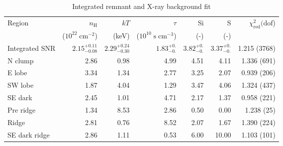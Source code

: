 \documentclass[preprint2,tighten,trackchanges]{aastex6}
\newcommand*{\mt}{\mathrm}
\newcommand*{\unit}[1]{\;\mt{#1}}  %
\newcommand*{\TauUnits}{\unit{s\;cm^{-3}}}
\begin{document}
\begin{table*}
    \centering
    \caption{Integrated remnant and X-ray background fit
    \label{tab:fits}}
    \begin{tabular}{@{}lrrrrrr@{}}
        \toprule
        Region & $n_\mathrm{H}$             & $kT$  & $\tau$   & Si  & S   & $\chi^2_{\mathrm{red}} (\mathrm{dof}$) \\
               & ($10^{22} \unit{cm^{-2}}$) & (keV) & ($10^{10} \TauUnits$) & (-) & (-) &  \\
        \midrule
        Integrated SNR %
            & ${2.15}^{+0.11}_{-0.08}$ %
            & ${2.29}^{+0.24}_{-0.30}$ %
            & ${1.83}^{+0.}_{-0.}$ %
            & ${3.82}^{+0.}_{-0.}$ %
            & ${3.37}^{+0.}_{-0.}$ %
            & 1.215 (3768) \\  %
        \midrule
        N clump & 2.86 & 0.98 & 4.99 & 4.51 & 4.11 & 1.336 (691) \\  %
        E lobe  & 3.34 & 1.34 & 2.77 & 3.25 & 2.07 & 0.939 (206) \\  %
        SW lobe & 1.87 & 4.04 & 1.29 & 3.47 & 4.06 & 1.324 (437) \\  %
        SE dark & 2.45 & 1.01 & 4.71 & 2.17 & 1.37 & 0.958 (221) \\  %
        \midrule
        Pre ridge & 1.34 & 8.53 & 2.86 & 0.50 & 0.00 & 1.238 (25) \\  %
        Ridge         & 2.81 & 0.76 & 8.52 & 2.07 &  1.67 & 1.390 (224) \\  %
        SE dark ridge & 2.86 & 1.11 & 0.53 & 6.00 & 10.00 & 1.103 (101) \\  %
        \bottomrule
    \end{tabular}
\end{table*}
\end{document}
